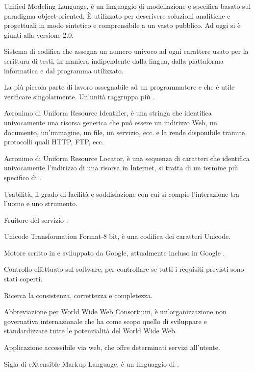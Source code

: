
Unified Modeling Language, è un linguaggio di modellazione e specifica basato sul paradigma object-oriented. 
È utilizzato per descrivere soluzioni analitiche e progettuali in modo sintetico e comprensibile a un vasto pubblico.
Ad oggi si è giunti alla versione 2.0.

Sistema di codifica che assegna un numero univoco ad ogni carattere usato per la scrittura di testi, in maniera indipendente dalla lingua, dalla piattaforma informatica e dal programma utilizzato.

La più piccola parte di lavoro assegnabile ad un programmatore e che è utile verificare singolarmente. Un'unità raggruppa più .

Acronimo di Uniform Resource Identifier, è una stringa che identifica univocamente una risorsa generica che può essere un indirizzo Web, un documento, un'immagine, un file, un servizio, ecc. e la rende disponibile tramite protocolli quali HTTP, FTP, ecc.

Acronimo di Uniform Resource Locator,  è una sequenza di caratteri che identifica univocamente l'indirizzo di una risorsa in Internet, si tratta di un termine più specifico di .

Usabilità, il grado di facilità e soddisfazione con cui si compie l'interazione tra l'uomo e uno strumento.

Fruitore del servizio \ProjectName{}.

Unicode Transformation Format-8 bit, è una codifica dei caratteri Unicode. 


Motore   scritto in   e sviluppato da Google, attualmente incluso in Google .

Controllo effettuato sul software, per controllare se tutti i requisiti previsti sono stati coperti.

Ricerca la consistenza, correttezza e completezza.


Abbreviazione per World Wide Web Consortium, è un'organizzazione non governativa internazionale che ha come scopo quello di sviluppare e standardizzare tutte le potenzialità del World Wide Web.

Applicazione accessibile via web, che offre determinati servizi all'utente.


Sigla di eXtensible Markup Language, è un linguaggio di .
%


